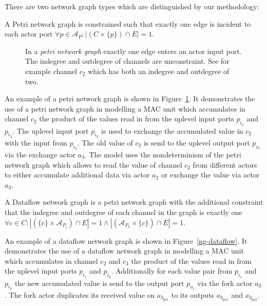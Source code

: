 There are two network graph types which are distinguished by our methodology:

\begin{definition}\label{petri-network-graph}
  A Petri network graph is constrained such that exactly
  one edge is incident to each actor port
  $\forall{p \in \mathcal{A}_{P}}: |(C \times \{p\}) \cap E| = 1$.
\end{definition}

\begin{figure}
\centering

\caption{\label{ng-petri}
  In a \emph{petri network graph} exactly
  one edge enters an actor input port. The
  indegree and outdegree of channels are
  unconstraint. See for example channel $c_2$
  which has both an indegree and outdegree of
  two.}
\end{figure}

  An example of a petri network graph is shown in Figure~\ref{ng-petri}.
  It demonstrates the use of a petri network graph in modelling
  a MAC unit which accumulates in channel $c_2$ the product of
  the values read in from the uplevel input ports $p_{i_1}$ and $p_{i_2}$.
  The uplevel input port $p_{i_3}$ is used to exchange the
  accumulated value in $c_2$ with the input from $p_{i_3}$. The
  old value of $c_2$ is send to the uplevel output port $p_{o_1}$
  via the exchange actor $a_3$. The model uses the nondeterminism
  of the petri network graph which allows to read the value of channel
  $c_2$ from different actors to either accumulate additional
  data via actor $a_2$ or exchange the value via actor $a_3$.

\begin{definition}\label{dataflow-network-graph}
  A Dataflow network graph is a petri network graph with the additional constraint
  that the indegree and outdegree of each channel in the graph is exactly one
  $\forall{c \in C}: |(\{c\} \times \mathcal{A}_{P_{i}}) \cap E| = 1 \wedge
                    |(\mathcal{A}_{P_{o}} \times \{c\}) \cap E| = 1$.
\end{definition}

  An example of a dataflow network graph is shown in Figure~\ref{ng-dataflow}.
  It demonstrates the use of a dataflow network graph in modelling
  a MAC unit which accumulates in channel $c_2$ and $c_3$ the product of
  the values read in from the uplevel input ports $p_{i_1}$ and $p_{i_2}$.
  Additionally for each value pair from $p_{i_1}$ and $p_{i_2}$ the
  new accumulated value is send to the output port $p_{o_1}$ via
  the fork actor $a_3$. The fork actor duplicates its received
  value on $a_{3_{pi1}}$ to its outputs $a_{3_{po1}}$ and $a_{3_{po2}}$.

